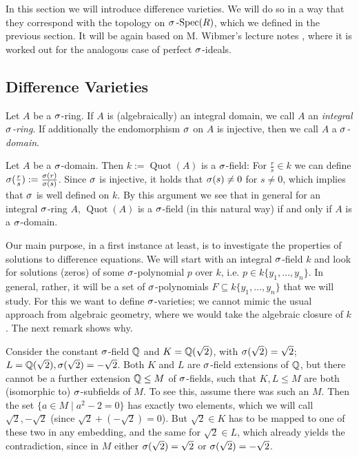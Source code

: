 In this section we will introduce difference varieties. We will do so in a way that they correspond with the topology on $\sigma\operatorname{-Spec}(R)$, which we defined in the previous section. It will be again based on M. Wibmer's lecture notes \cite{wibmer}, 
where it is worked out for the analogous case of perfect $\sigma$-ideals.

\subsection{Difference Varieties}


\begin{defn}
Let $A$ be a $\sigma$-ring. If $A$ is (algebraically) an integral domain, we call $A$ an \emph{integral $\sigma$-ring}. If additionally the endomorphism $\sigma$ on $A$ is injective, then we call $A$ a \emph{$\sigma$-domain}.  
\end{defn}

\begin{rem}\label{sdomain=field}
Let $A$ be a $\sigma$-domain. Then $k:=\operatorname{Quot}(A)$ is a $\sigma$-field: For $\frac{r}{s} \in k$ we can define $\sigma(\frac{r}{s}):= \frac{\sigma(r)}{\sigma(s)}$. Since $\sigma$ is injective, it holds that $\sigma(s) \neq 0$ for $s \neq 0$, which implies that $\sigma$ is well defined on $k$.
By this argument we see that in general for an integral $\sigma$-ring $A$, $\operatorname{Quot}(A)$ is a $\sigma$-field (in this natural way) if and only if $A$ is a $\sigma$-domain.
\end{rem}

Our main purpose, in a first instance at least, is to investigate the properties of solutions to difference equations. 
We will start with an integral $\sigma$-field $k$ and look for solutions (zeros) of some $\sigma$-polynomial $p$ over $k$, i.e. $p \in k\{y_1, \ldots, y_n \}$. In general, rather, it will be a set of $\sigma$-polynomials $F \subseteq k\{y_1, \ldots, y_n \}$ that we will study. 
For this we want to define $\sigma$-varieties; we cannot mimic the usual approach from algebraic geometry, where we would take the algebraic closure of $k$. The next remark shows why.

\begin{rem}\label{incompatibleextensions}
 Consider the constant $\sigma$-field $\mathbb{Q}$ and $K = \mathbb{Q}(\sqrt{2})$, with $\sigma (\sqrt{2}) = \sqrt{2}$; $L = \mathbb{Q}(\sqrt{2}), \sigma(\sqrt{2}) = - \sqrt{2}$. 
Both $K$ and $L$ are $\sigma$-field extensions of $\mathbb{Q}$, but there cannot be a further extension $\mathbb{Q} \leq M$ of $\sigma$-fields, such that $K,L \leq M$ are both (isomorphic to) $\sigma$-subfields of $M$. 
To see this, assume there was such an $M$. Then the set $\{ a \in M \mid a^2 - 2 = 0 \}$ has exactly two elements, which we will call $\sqrt{2}, -\sqrt{2}$ (since $\sqrt{2} + (- \sqrt{2}) = 0$).
But $\sqrt{2} \in K$ has to be mapped to one of these two in any embedding, and the same for $\sqrt{2} \in L$, which already yields the contradiction,
 since in $M$ either $\sigma(\sqrt{2}) = \sqrt{2}$ or $\sigma(\sqrt{2}) = -\sqrt{2}$.
\end{rem}

